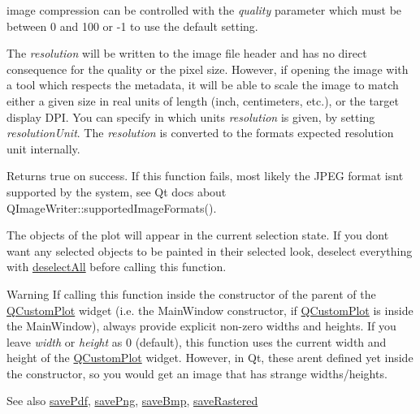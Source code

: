 image compression can be controlled with the {\itshape quality} parameter which must be between 0 and 100 or -\/1 to use the default setting.

The {\itshape resolution} will be written to the image file header and has no direct consequence for the quality or the pixel size. However, if opening the image with a tool which respects the metadata, it will be able to scale the image to match either a given size in real units of length (inch, centimeters, etc.), or the target display D\+PI. You can specify in which units {\itshape resolution} is given, by setting {\itshape resolution\+Unit}. The {\itshape resolution} is converted to the format\textquotesingle{}s expected resolution unit internally.

Returns true on success. If this function fails, most likely the J\+P\+EG format isn\textquotesingle{}t supported by the system, see Qt docs about Q\+Image\+Writer\+::supported\+Image\+Formats().

The objects of the plot will appear in the current selection state. If you don\textquotesingle{}t want any selected objects to be painted in their selected look, deselect everything with \hyperlink{class_q_custom_plot_a9d4808ab925b003054085246c92a257c}{deselect\+All} before calling this function.

\begin{DoxyWarning}{Warning}
If calling this function inside the constructor of the parent of the \hyperlink{class_q_custom_plot}{Q\+Custom\+Plot} widget (i.\+e. the Main\+Window constructor, if \hyperlink{class_q_custom_plot}{Q\+Custom\+Plot} is inside the Main\+Window), always provide explicit non-\/zero widths and heights. If you leave {\itshape width} or {\itshape height} as 0 (default), this function uses the current width and height of the \hyperlink{class_q_custom_plot}{Q\+Custom\+Plot} widget. However, in Qt, these aren\textquotesingle{}t defined yet inside the constructor, so you would get an image that has strange widths/heights.
\end{DoxyWarning}
\begin{DoxySeeAlso}{See also}
\hyperlink{class_q_custom_plot_ad5acd34f6b39c3516887d7e54fec2412}{save\+Pdf}, \hyperlink{class_q_custom_plot_ac92cc9256d12f354b40a4be4600b5fb9}{save\+Png}, \hyperlink{class_q_custom_plot_ae3a86ed0795670e50afa21759d4fa13d}{save\+Bmp}, \hyperlink{class_q_custom_plot_ad7723ce2edfa270632ef42b03a444352}{save\+Rastered} 
\end{DoxySeeAlso}
